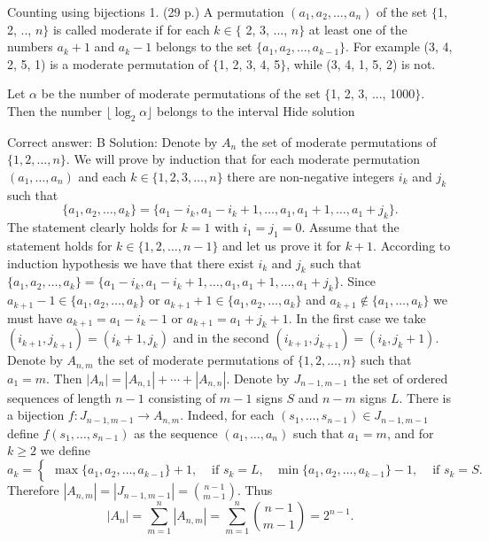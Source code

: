 Counting using bijections
1.	(29 p.)
	A permutation \( (a_1, a_2, \dots, a_n) \) of the set \( \{ \)1, 2, .., \( n\} \) is called moderate if for each \( k\in\{ \) 2, 3, ..., \( n\} \) at least one of the numbers \( a_k+1 \) and \( a_k-1 \) belongs to the set \( \{a_1, a_2, \dots, a_{k-1}\} \). For example (3, 4, 2, 5, 1) is a moderate permutation of \( \{ \)1, 2, 3, 4, 5\( \} \), while (3, 4, 1, 5, 2) is not.

Let \( \alpha \) be the number of moderate permutations of the set \( \{ \)1, 2, 3, ..., 1000\( \} \). Then the number \( \lfloor\log_2\alpha\rfloor \) belongs to the interval
Hide solution

Correct answer: B
Solution: Denote by \( A_n \) the set of moderate permutations of \( \{1,2,\dots, n\} \). We will prove by induction that for each moderate permutation \( (a_1, \dots, a_n) \) and each \( k\in\{1,2,3,\dots, n\} \) there are non-negative integers \( i_k \) and \( j_k \) such that \[ \{a_1, a_2,\dots, a_k\}=\{a_1-i_k, a_1-i_k+1,\dots, a_1,a_1+1,\dots, a_1+j_k\}.\] The statement clearly holds for \( k=1 \) with \( i_1=j_1=0 \). Assume that the statement holds for \( k\in\{1,2,\dots, n-1\} \) and let us prove it for \( k+1 \). According to induction hypothesis we have that there exist \( i_k \) and \( j_k \) such that \( \{a_1, a_2,\dots, a_k\}=\{a_1-i_k, a_1-i_k+1,\dots, a_1,a_1+1,\dots, a_1+j_k\} \). Since \( a_{k+1}-1\in\{a_1, a_2,\dots, a_k\} \) or \( a_{k+1}+1\in\{a_1, a_2,\dots, a_k\} \) and \( a_{k+1}\not\in \{a_1,\dots, a_k\} \) we must have \( a_{k+1}=a_1-i_k-1 \) or \( a_{k+1}=a_1+j_k+1 \). In the first case we take \( (i_{k+1},j_{k+1})=(i_k+1,j_k) \) and in the second \( (i_{k+1},j_{k+1})=(i_k,j_k+1) \). Denote by \( A_{n,m} \) the set of moderate permutations of \( \{1,2,\dots, n\} \) such that \( a_1=m \). Then \( |A_n|=|A_{n,1}|+\cdots+|A_{n,n}| \). Denote by \( J_{n-1,m-1} \) the set of ordered sequences of length \( n-1 \) consisting of \( m-1 \) signs \( S \) and \( n-m \) signs \( L \). There is a bijection \( f:J_{n-1,m-1}\to A_{n,m} \). Indeed, for each \( (s_1,\dots, s_{n-1})\in J_{n-1,m-1} \) define \( f(s_1,\dots, s_{n-1}) \) as the sequence \( (a_1,\dots, a_n) \) such that \( a_1=m \), and for \( k\geq 2 \) we define \[ a_k=\left\{\begin{array}{rl}\max\{a_1,a_2,\dots, a_{k-1}\}+1,&\mbox{ if }s_k=L, & \min\{a_1,a_2,\dots, a_{k-1}\}-1, &\mbox{ if }s_k=S.\end{array} \right.\] Therefore \( |A_{n,m}|=|J_{n-1,m-1}|=\binom{n-1}{m-1} \). Thus \[ |A_n|=\sum_{m=1}^{n} |A_{n,m}|=\sum_{m=1}^n \binom{n-1}{m-1}=2^{n-1}.\]

